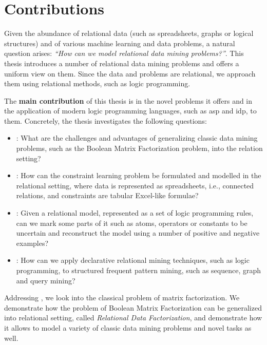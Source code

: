 \section{Contributions}
Given the abundance of relational data (such as spreadsheets, graphs
or logical structures) and of various machine learning and data
problems, a natural question arises: \textit{``How can we model
relational data mining problems?''}. This thesis introduces a number
of relational data mining problems and offers a uniform view on them.
Since the data and problems are relational, we approach them using
relational methods, such as logic programming. 

The \textbf{main contribution} of this thesis is in the novel problems
it offers and in the application of modern logic programming
        languages, such as \acrshort{asp} and \acrshort{idp}, to them. Concretely, the thesis investigates the following questions:

                       
\begin{itemize}
  \item \cone: What are the challenges and advantages of generalizing
    classic data mining problems, such as the Boolean Matrix
    Factorization problem, into the relation setting?
  \item \ctwo: How can the constraint learning problem be formulated
   and modelled in the relational setting, where data is
   represented as spreadsheets, i.e., connected relations, and constraints are
   tabular Excel-like formulae?
  \item \cthree: Given a relational model, represented as a set of logic
    programming rules, can we mark some parts of it such as atoms,
    operators or constants to be uncertain and reconstruct the model
    using a number of positive and negative examples?
  \item \cfour: 
    How can we apply declarative relational mining
    techniques, such as logic programming, to structured frequent pattern mining, such as sequence, graph
    and query mining?
\end{itemize}

Addressing \cone, we look into the classical problem of matrix
factorization. We demonstrate how the problem of Boolean Matrix
Factorization can be generalized into relational setting, called
\textit{Relational Data Factorization}, and
demonstrate how it allows to model a variety of classic data mining
problems and novel tasks as well.


